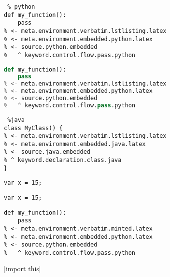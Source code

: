 \documentclass[12pt]{article}
\newcommand\"{quote}
\begin{document}
\begin{lstlisting} % python
def my_function():
    pass
% <- meta.environment.verbatim.lstlisting.latex
% <- meta.environment.embedded.python.latex
% <- source.python.embedded
%   ^ keyword.control.flow.pass.python
\end{lstlisting}

\begin{lstlisting}[frame=single,
                   language=python] %python
def my_function():
    pass
% <- meta.environment.verbatim.lstlisting.latex
% <- meta.environment.embedded.python.latex
% <- source.python.embedded
%   ^ keyword.control.flow.pass.python
\end{lstlisting}

\begin{lstlisting} %java
class MyClass() {
% <- meta.environment.verbatim.lstlisting.latex
% <- meta.environment.embedded.java.latex
% <- source.java.embedded
% ^ keyword.declaration.class.java
}
\end{lstlisting}

\lstinline{var x = 15;}

\lstinline|var x = 15;|



\begin{verbatim}
def my_function():
    pass
% <- meta.environment.verbatim.minted.latex
% <- meta.environment.embedded.python.latex
% <- source.python.embedded
%   ^ keyword.control.flow.pass.python
\end{verbatim}



|import this|
\end{document}
